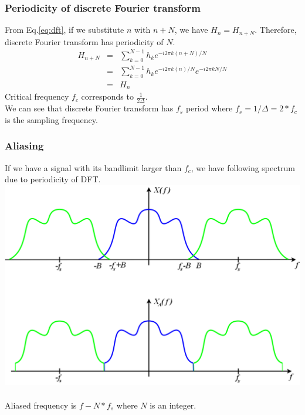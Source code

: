 \documentclass{beamer}
\begin{document}
\begin{frame}
\label{dft_periodicity}
\frametitle{Periodicity of discrete Fourier transform}
From Eq.\ref{eq:dft}, if we substitute $n$ with $n+N$, we have $H_n = H_{n+N}$. Therefore, discrete Fourier transform has periodicity of $N$.
\begin{eqnarray}
H_{n+N} &=& \sum_{k=0}^{N-1}h_ke^{-i2\pi k(n+N)/N} \nonumber \\
&=&\sum_{k=0}^{N-1}h_ke^{-i2\pi k(n)/N}e^{-i2\pi kN/N} \nonumber \\
&=&H_n
\end{eqnarray}
Critical frequency $f_c$ corresponds to $\frac{1}{2\Delta}$.\\
We can see that discrete Fourier transform has $f_s$ period where $f_s = 1/\Delta=2*f_c$ is the sampling frequency.
\end{frame}
\begin{frame}
\frametitle{Aliasing}
If we have a signal with its bandlimit larger than $f_c$, we have following spectrum due to periodicity of DFT.\\
\includegraphics[scale=0.1]{wiki_AliasedSpectrum.png} ~\cite{wiki_sampling_theorem}\\
Aliased frequency is $f-N*f_s$ where $N$ is an integer.
\end{frame}
\end{document}
